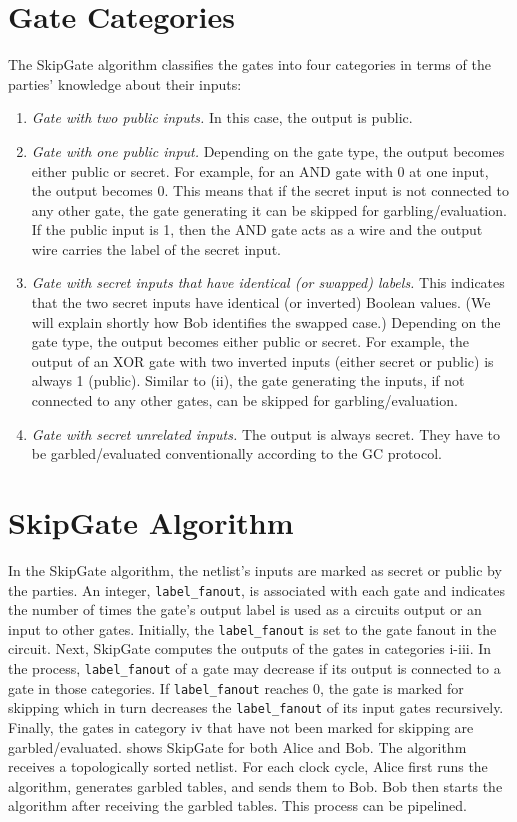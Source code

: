 \section{Gate Categories}\label{ssect:skipgate_example}
The SkipGate algorithm classifies the gates into four categories in terms of the parties' knowledge about their inputs:

\begin{enumerate}[label=\roman*]
  \item \textit{Gate with two public inputs.} In this case, the output is public.
  \item \textit{Gate with one public input.}
  	Depending on the gate type, the output becomes either public or secret.
  	For example, for an AND gate with 0 at one input, the output becomes 0.
  	This means that if the secret input is not connected to any other gate, the gate generating it can be skipped for garbling/evaluation.
  	If the public input is 1, then the AND gate acts as a wire and the output wire carries the label of the secret input.
  \item \textit{Gate with secret inputs that have identical (or swapped) labels.}
    This indicates that the two secret inputs have identical (or inverted) Boolean values.
    (We will explain shortly how Bob identifies the swapped case.)
    Depending on the gate type, the output becomes either public or secret.
    For example, the output of an XOR gate with two inverted inputs (either secret or public) is always 1 (public).
  	Similar to (ii), the gate generating the inputs, if not connected to any other gates, can be skipped for garbling/evaluation.
  \item \textit{Gate with secret unrelated inputs.}
  	The output is always secret.
  	They have to be garbled/evaluated conventionally according to the GC protocol.
\end{enumerate}

\section{{SkipGate} Algorithm}\label{ssect:skipgate_algorithm}
In the SkipGate algorithm, the netlist's inputs are marked as secret or public by the parties.
An integer, \texttt{label\_fanout}, is associated with each gate and indicates the number of times the gate's output label is used as a circuits output or an input to other gates.
Initially, the \texttt{label\_fanout} is set to the gate fanout in the circuit.
Next, SkipGate computes the outputs of the gates in categories i-iii.
In the process, \texttt{label\_fanout} of a gate may decrease if its output is connected to a gate in those categories.
If \texttt{label\_fanout} reaches 0, the gate is marked for skipping which in turn decreases the \texttt{label\_fanout} of its input gates recursively.
Finally, the gates in category iv that have not been marked for skipping are garbled/evaluated.
 shows SkipGate for both Alice and Bob.
The algorithm receives a topologically sorted netlist.
For each clock cycle, Alice first runs the algorithm, generates garbled tables, and sends them to Bob.
Bob then starts the algorithm after receiving the garbled tables.
This process can be pipelined.

